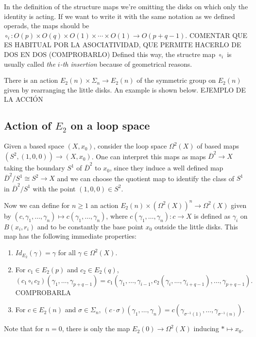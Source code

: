 \documentclass[TFM.tex]{subfiles}
\begin{document}
\begin{remark}
In the definition of the structure maps we're omitting the disks on which only the identity is acting. If we want to write it with the same notation as we defined operads, the maps should be $\circ_i:O(p)\times O(q)\times O(1)\times\cdots \times O(1)\to O(p+q-1)$. COMENTAR QUE ES HABITUAL POR LA ASOCIATIVIDAD, QUE PERMITE HACERLO DE DOS EN DOS (COMPROBARLO) Defined this way, the structre map $\circ_i$ is usually called \emph{the $i$-th insertion} because of geometrical reasons. 
\end{remark}

There is an action $E_2(n)\times \Sigma_n\to E_2(n)$ of the symmetric group on $E_2(n)$ given by rearranging the little disks. An example is shown below.
EJEMPLO DE LA ACCIÓN



\subsection{Action of $E_2$ on a loop space}
Given a based space $(X,x_0)$, consider the loop space $\Omega^2(X)$ of based maps $(S^2, (1,0,0))\to (X, x_0)$. One can interpret this maps as maps $\overline{D}^2\to X$ taking the boundary $S^1$ of $\overline{D}^2$ to $x_0$, since they induce a well defined map $\overline{D}^2/S^1\cong S^2\to X$ and we can choose the quotient map to identify the class of $S^1$ in $\overline{D}^2/S^1$ with the point $(1,0,0)\in S^2$. 

Now we can define for $n\geq 1$ an action $E_2(n)\times (\Omega^2(X))^n\to \Omega^2(X)$ given by $(c,\gamma_1,\dots, \gamma_n)\mapsto c(\gamma_1,\dots, \gamma_n)$, where 
$c(\gamma_1,\dots, \gamma_n):c\to X$ is defined as $\gamma_i$ on $B(x_i,r_i)$ and to be constantly the base point $x_0$ outside the little disks. This map has the following immediate properties:
\begin{enumerate}
\item $Id_{E_2}(\gamma)=\gamma$ for all $\gamma\in \Omega^2(X)$.
\item For $c_1\in E_2(p)$ and $c_2\in E_2(q)$, 
$$(c_1\circ_i c_2)(\gamma_1,\dots, \gamma_{p+q-1})=c_1(\gamma_1,\dots, \gamma_{i-1}, c_2(\gamma_i,\dots, \gamma_{i+q-1}),\dots, \gamma_{p+q-1}).$$ COMPROBARLA
\item For $c\in E_2(n)$ and $\sigma\in\Sigma_n$, $(c\cdot \sigma)(\gamma_1,\dots,\gamma_n)=c(\gamma_{\sigma^{-1}(1)},\dots, \gamma_{\sigma^{-1}(n)})$. 
\end{enumerate}
Note that for $n=0$, there is only the map $E_2(0)\to\Omega^2(X)$ inducing $*\mapsto x_0$. 
\end{document}
